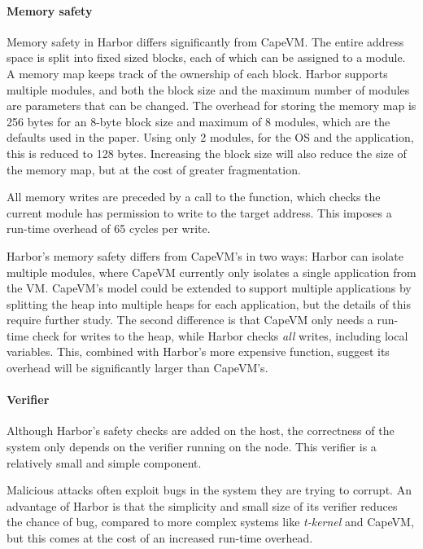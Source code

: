 \paragraph{Memory safety}
Memory safety in Harbor differs significantly from CapeVM. The entire address space is split into fixed sized blocks, each of which can be assigned to a module. A memory map keeps track of the ownership of each block.
Harbor supports multiple modules, and both the block size and the maximum number of modules are parameters that can be changed. The overhead for storing the memory map is 256 bytes for an 8-byte block size and maximum of 8 modules, which are the defaults used in the paper. Using only 2 modules, for the OS and the application, this is reduced to 128 bytes. Increasing the block size will also reduce the size of the memory map, but at the cost of greater fragmentation.

All memory writes are preceded by a call to the  function, which checks the current module has permission to write to the target address. This imposes a run-time overhead of 65 cycles per write.

Harbor's memory safety differs from CapeVM's in two ways: Harbor can isolate multiple modules, where CapeVM currently only isolates a single application from the VM. CapeVM's model could be extended to support multiple applications by splitting the heap into multiple heaps for each application, but the details of this require further study. The second difference is that CapeVM only needs a run-time check for writes to the heap, while Harbor checks \emph{all} writes, including local variables. This, combined with Harbor's more expensive  function, suggest its overhead will be significantly larger than CapeVM's.

\paragraph{Verifier}
Although Harbor's safety checks are added on the host, the correctness of the system only depends on the verifier running on the node. This verifier is a relatively small and simple component.

Malicious attacks often exploit bugs in the system they are trying to corrupt. An advantage of Harbor is that the simplicity and small size of its verifier reduces the chance of bug, compared to more complex systems like \emph{t-kernel} and CapeVM, but this comes at the cost of an increased run-time overhead.

